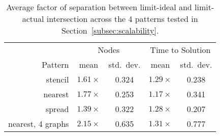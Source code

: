 \begin{table}[t]
\color{blue}
\centering
\small
\begin{tabular}{r | c | c | c | c}
        & \multicolumn{2}{|c|}{Nodes} & \multicolumn{2}{|c}{Time to Solution} \\
Pattern & mean & std.~dev. & mean & std.~dev. \\
\hline
stencil & $1.61\times$ & 0.324 & $1.29\times$ & 0.238 \\
nearest & $1.77\times$ & 0.253 & $1.17\times$ & 0.341 \\
spread  & $1.39\times$ & 0.322 & $1.28\times$ & 0.207 \\
nearest, 4 graphs & $2.15\times$ & 0.635 & $1.31\times$ & 0.777
\end{tabular}

\vspace{-0.20cm}
\caption{\color{blue} Average factor of separation between limit-ideal and limit-actual intersection across the 4 patterns tested in Section~\ref{subsec:scalability}.\label{tab:metg-predict-strong}}
\vspace{-0.5cm}
\end{table}
